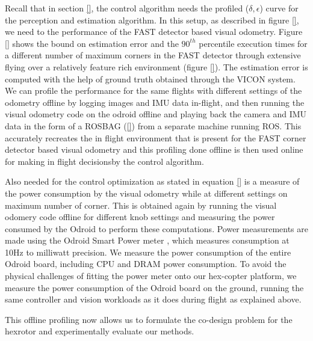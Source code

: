 Recall that in section \ref{}, the control algorithm needs the profiled ($\delta,\epsilon$) curve for the perception and estimation algorithm. In this setup, as described in figure \ref{}, we need to the performance of the FAST detector based visual odometry. Figure \ref{} shows the bound on estimation error and the $90^{th}$ percentile execution times for a different number of maximum corners in the FAST detector through extensive flying over a relatively feature rich environment (figure \ref{}). The estimation error is computed with the help of ground truth obtained through the VICON system. We can profile the performance for the same flights with different settings of the odometry offline by logging images and IMU data in-flight, and then running the visual odometry code on the odroid offline and playing back the camera and IMU data in the form of a ROSBAG (\ref{}) from a separate machine running ROS. 
This accurately recreates the in flight environment that is present for the FAST corner detector based visual odometry and this profiling done offline is then used online for making in flight decisionsby the control algorithm.

Also needed for the control optimization as stated in equation \ref{} is a measure of the power consumption by the visual odometry while at different settings on maximum number of corner. This is obtained again by running the visual odomery code offline for different knob settings and measuring the power consumed by the Odroid to perform these computations. Power measurements are made using the Odroid Smart Power meter \cite{OdroidSmartPower}, which measures consumption at 10Hz to milliwatt precision. We measure the power consumption of the entire Odroid board, including CPU and DRAM power consumption. To avoid the physical challenges of fitting the power meter onto our hex-copter platform, we measure the power consumption of the Odroid board on the ground, running the same controller and vision workloads as it does during flight as explained above.

This offline profiling now allows us to formulate the co-design problem for the hexrotor and experimentally evaluate our methods.


